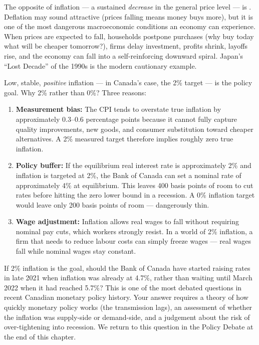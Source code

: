 The opposite of inflation --- a sustained \textit{decrease} in the general
price level --- is . Deflation may sound attractive
(prices falling means money buys more), but it is one of the most dangerous
macroeconomic conditions an economy can experience. When prices are expected
to fall, households postpone purchases (why buy today what will be cheaper
tomorrow?), firms delay investment, profits shrink, layoffs rise, and the
economy can fall into a self-reinforcing downward spiral. Japan's ``Lost
Decade'' of the 1990s is the modern cautionary example.

Low, stable, \textit{positive} inflation --- in Canada's case, the
2\% target --- is the policy goal. Why 2\% rather than 0\%? Three reasons:

\begin{enumerate}
  \item \textbf{Measurement bias:} The CPI tends to overstate true inflation
        by approximately 0.3--0.6 percentage points because it cannot
        fully capture quality improvements, new goods, and consumer
        substitution toward cheaper alternatives. A 2\% measured target
        therefore implies roughly zero true inflation.
  \item \textbf{Policy buffer:} If the equilibrium real interest rate is
        approximately 2\% and inflation is targeted at 2\%, the Bank of
        Canada can set a nominal rate of approximately 4\% at equilibrium.
        This leaves 400 basis points of room to cut rates before hitting
        the zero lower bound in a recession. A 0\% inflation target would
        leave only 200 basis points of room --- dangerously thin.
  \item \textbf{Wage adjustment:} Inflation allows real wages to fall
        without requiring nominal pay cuts, which workers strongly resist.
        In a world of 2\% inflation, a firm that needs to reduce labour
        costs can simply freeze wages --- real wages fall while nominal
        wages stay constant.
\end{enumerate}

\begin{thinkbox}
If 2\% inflation is the goal, should the Bank of Canada have started
raising rates in late 2021 when inflation was already at 4.7\%, rather than
waiting until March 2022 when it had reached 5.7\%? This is one of the
most debated questions in recent Canadian monetary policy history.
Your answer requires a theory of how quickly monetary policy works
(the transmission lags), an assessment of whether the inflation was
supply-side or demand-side, and a judgement about the risk of
over-tightening into recession. We return to this question in the
Policy Debate at the end of this chapter.
\end{thinkbox}

